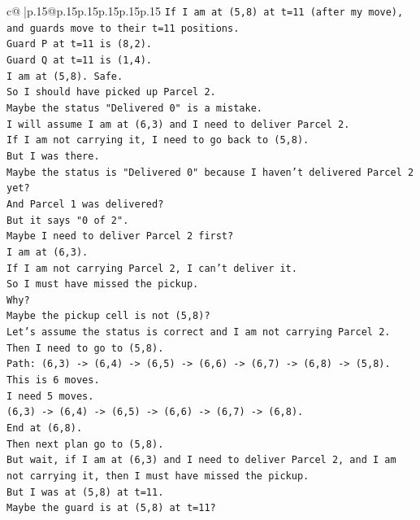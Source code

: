 \documentclass{article}
\begin{document}
{\begin{supertabular}{c@{$\;$}|p{.15\linewidth}@{}p{.15\linewidth}p{.15\linewidth}p{.15\linewidth}p{.15\linewidth}p{.15\linewidth}}
{{{\texttt{If I am at (5,8) at t=11 (after my move), and guards move to their t=11 positions.} \\
\texttt{Guard P at t=11 is (8,2).} \\
\texttt{Guard Q at t=11 is (1,4).} \\
\texttt{I am at (5,8). Safe.} \\
\texttt{So I should have picked up Parcel 2.} \\
\texttt{Maybe the status "Delivered 0" is a mistake.} \\
\texttt{I will assume I am at (6,3) and I need to deliver Parcel 2.} \\
\texttt{If I am not carrying it, I need to go back to (5,8).} \\
\texttt{But I was there.} \\
\texttt{Maybe the status is "Delivered 0" because I haven't delivered Parcel 2 yet?} \\
\texttt{And Parcel 1 was delivered?} \\
\texttt{But it says "0 of 2".} \\
\texttt{Maybe I need to deliver Parcel 2 first?} \\
\texttt{I am at (6,3).} \\
\texttt{If I am not carrying Parcel 2, I can't deliver it.} \\
\texttt{So I must have missed the pickup.} \\
\texttt{Why?} \\
\texttt{Maybe the pickup cell is not (5,8)?} \\
\texttt{Let's assume the status is correct and I am not carrying Parcel 2.} \\
\texttt{Then I need to go to (5,8).} \\
\texttt{Path: (6,3) {-}> (6,4) {-}> (6,5) {-}> (6,6) {-}> (6,7) {-}> (6,8) {-}> (5,8).} \\
\texttt{This is 6 moves.} \\
\texttt{I need 5 moves.} \\
\texttt{(6,3) {-}> (6,4) {-}> (6,5) {-}> (6,6) {-}> (6,7) {-}> (6,8).} \\
\texttt{End at (6,8).} \\
\texttt{Then next plan go to (5,8).} \\
\texttt{But wait, if I am at (6,3) and I need to deliver Parcel 2, and I am not carrying it, then I must have missed the pickup.} \\
\texttt{But I was at (5,8) at t=11.} \\
\texttt{Maybe the guard is at (5,8) at t=11?} \\
}}}
\end{supertabular}}
\end{document}
